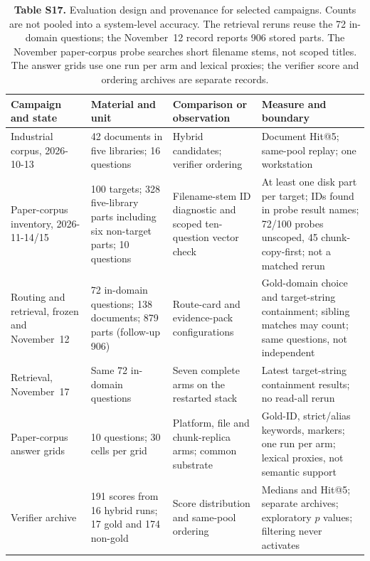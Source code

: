 \begin{table}
\centering
\footnotesize
\setlength{\tabcolsep}{4pt}
\caption{\textbf{Table S17.} Evaluation design and provenance for selected campaigns. Counts
are not pooled into a system-level accuracy. The retrieval reruns reuse the
72 in-domain questions; the November~12 record reports 906 stored parts.
The November paper-corpus probe searches short filename stems, not scoped
titles. The answer grids use one run per arm and lexical proxies; the verifier
score and ordering archives are separate records.}

\begin{tabular}{@{}p{2.640cm}p{3.465cm}p{4.125cm}p{4.950cm}@{}}
\toprule
Campaign and state & Material and unit & Comparison or observation & Measure and boundary\\
\midrule
Industrial corpus, 2026-10-13 & 42 documents in five libraries; 16 questions & Hybrid candidates; verifier ordering & Document Hit@5; same-pool replay; one workstation\\
Paper-corpus inventory, 2026-11-14/15 & 100 targets; 328 five-library parts including six non-target parts; 10 questions & Filename-stem ID diagnostic and scoped ten-question vector check & At least one disk part per target; IDs found in probe result names; 72/100 probes unscoped, 45 chunk-copy-first; not a matched rerun\\
Routing and retrieval, frozen and November~12 & 72 in-domain questions; 138 documents; 879 parts (follow-up 906) & Route-card and evidence-pack configurations & Gold-domain choice and target-string containment; sibling matches may count; same questions, not independent\\
Retrieval, November~17 & Same 72 in-domain questions & Seven complete arms on the restarted stack & Latest target-string containment results; no read-all rerun\\
Paper-corpus answer grids & 10 questions; 30 cells per grid & Platform, file and chunk-replica arms; common substrate & Gold-ID, strict/alias keywords, markers; one run per arm; lexical proxies, not semantic support\\
Verifier archive & 191 scores from 16 hybrid runs; 17 gold and 174 non-gold & Score distribution and same-pool ordering & Medians and Hit@5; separate archives; exploratory $p$ values; filtering never activates\\
\bottomrule
\end{tabular}
\end{table}

